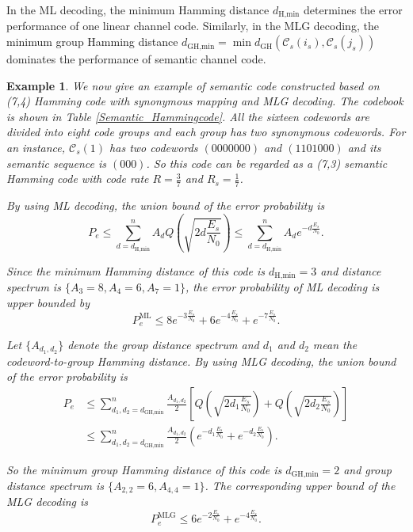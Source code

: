 \documentclass[12pt, draftclsnofoot,onecolumn]{IEEEtran}
\newtheorem{example}{\bf{Example}}
\begin{document}
In the ML decoding, the minimum Hamming distance $d_{\text{H,min}}$ determines the error performance of one linear channel code. Similarly, in the MLG decoding, the minimum group Hamming distance $d_{\text{GH,min}}=\min d_{\text{GH}}(\mathcal{C}_s(i_s),\mathcal{C}_s(j_s))$ dominates the performance of semantic channel code.

\begin{example}
We now give an example of semantic code constructed based on (7,4) Hamming code with synonymous mapping and MLG decoding. The codebook is shown in Table \ref{Semantic_Hammingcode}. All the sixteen codewords are divided into eight code groups and each group has two synonymous codewords. For an instance, $\mathcal{C}_s(1)$ has two codewords $(0000000)$ and $(1101000)$ and its semantic sequence is $(000)$. So this code can be regarded as a (7,3) semantic Hamming code with code rate $R=\frac{3}{7}$ and $R_s=\frac{1}{7}$.

By using ML decoding, the union bound of the error probability is
\begin{equation}
P_e \leq \sum_{d=d_{\text{H,min}}}^{n} A_d Q\left(\sqrt{2d \frac{E_s}{N_0}}\right) \leq \sum_{d=d_{\text{H,min}}}^{n} A_d e^{-d\frac{E_s}{N_0}}.
\end{equation}

Since the minimum Hamming distance of this code is $d_{\text{H,min}}=3$ and distance spectrum is $\{A_3=8,A_4=6,A_7=1\}$, the error probability of ML decoding is upper bounded by
\begin{equation}\label{ML_UB}
P_e^{\text{ML}} \leq 8e^{-3\frac{E_s}{N_0}}+6e^{-4\frac{E_s}{N_0}}+e^{-7\frac{E_s}{N_0}}.
\end{equation}

Let $\{A_{d_1,d_2}\}$ denote the group distance spectrum and $d_1$ and $d_2$ mean the codeword-to-group Hamming distance. By using MLG decoding, the union bound of the error probability is
\begin{equation}
\begin{aligned}
P_e &\leq \sum_{d_1,d_2=d_{\text{GH,min}}}^{n} \frac{A_{d_1,d_2}}{2}\left[Q\left(\sqrt{2d_1 \frac{E_s}{N_0}}\right)+Q\left(\sqrt{2d_2 \frac{E_s}{N_0}}\right) \right]\\
&\leq \sum_{d_1,d_2=d_{\text{GH,min}}}^{n} \frac{A_{d_1,d_2}}{2}\left(e^{-d_1\frac{E_s}{N_0}}+e^{-d_2\frac{E_s}{N_0}}\right).
\end{aligned}
\end{equation}

So the minimum group Hamming distance of this code is $d_{\text{GH,min}}=2$ and group distance spectrum is $\{A_{2,2}=6,A_{4,4}=1\}$. The corresponding upper bound of the MLG decoding is
\begin{equation}\label {MLG_UB}
P_e^{\text{MLG}} \leq 6e^{-2\frac{E_s}{N_0}}+e^{-4\frac{E_s}{N_0}}.
\end{equation}


\end{example}
\end{document}
